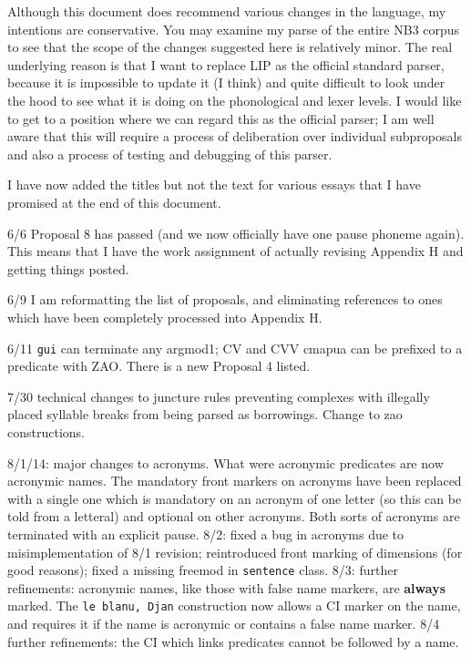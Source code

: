 \documentclass[12pt]{article}
\begin{document}
Although this document does recommend various changes in the language, my intentions are conservative.  You may examine my parse of the entire NB3 corpus to see that the scope of the changes suggested here
is relatively minor.  The real underlying reason is that I want to replace LIP as the official standard parser, because it is impossible to update it (I think) and quite difficult to look under the hood to see what it is doing on the phonological and lexer levels.  I would like to get to a position where we can regard this as the official parser;
I am well aware that this will require a process of deliberation over individual subproposals and also a process of testing and debugging of this parser.

I have now added the titles but not the text for various essays that I have promised at the end of this document.

6/6 Proposal 8 has passed (and we now officially have one pause phoneme again).  This means that I have the work assignment of actually revising Appendix H and getting things posted.

6/9 I am reformatting the list of proposals, and eliminating references to ones which have been completely processed into Appendix H.

6/11  {\tt gui} can terminate any argmod1; CV and CVV cmapua can be prefixed to a predicate with ZAO.  There is a new Proposal 4 listed.

7/30 technical changes to juncture rules preventing complexes with illegally placed syllable breaks from being parsed as borrowings.  Change to zao constructions.

8/1/14:  major changes to acronyms.   What were acronymic predicates are now acronymic names.  The mandatory front markers on acronyms have been replaced with a single one
which is mandatory on an acronym of one letter (so this can be told from a letteral) and optional on other acronyms.  Both sorts of acronyms are terminated with an explicit pause.   8/2:  fixed a bug in acronyms due to misimplementation of 8/1 revision; reintroduced front marking of dimensions (for good reasons); fixed a missing freemod in {\tt sentence} class.  8/3:  further refinements:  acronymic names, like those with false name markers, are {\bf always} marked.  The {\tt le blanu, Djan} construction now allows a CI marker on the name, and requires it if the name is acronymic or contains a false name marker.  8/4 further refinements:  the CI which links predicates cannot be followed by a name.
\end{document}
